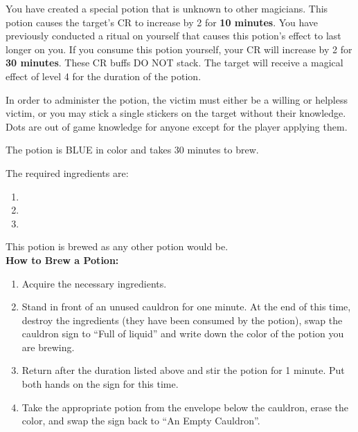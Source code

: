 \documentclass[green]{NeptuneBall}
\begin{document}
\name{\gBuff{}}

You have created a special potion that is unknown to other magicians. This potion causes the target's CR to increase by 2 for {\bf 10 minutes}.  You have previously conducted a ritual on yourself that causes this potion's effect to last longer on you. If you consume this potion yourself, your CR will increase by 2 for {\bf 30 minutes}. These CR buffs DO NOT stack. The target will receive a magical effect of level 4 for the duration of the potion.

In order to administer the potion, the victim must either be a willing or helpless victim, or you may stick a single stickers on the target without their knowledge. Dots are out of game knowledge for anyone except for the player applying them.

The potion is BLUE in color and takes 30 minutes to brew. 

The required ingredients are:
\begin{enumerate}
\item \iManOfWar{}
\item \iTeeth{}
\item \iSwordfish{}
\end{enumerate}

This potion is brewed as any other potion would be.\\

{\bf How to Brew a Potion:}\\ %
\begin{enumerate}
  \item Acquire the necessary ingredients.
  \item Stand in front of an unused cauldron for one minute. At the end of this time, destroy the ingredients (they have been consumed by the potion), swap the cauldron sign to ``Full of liquid'' and write down the color of the potion you are brewing.
  \item Return after the duration listed above and stir the potion for 1 minute. Put both hands on the sign for this time.
  \item Take the appropriate potion from the envelope below the cauldron, erase the color, and swap the sign back to ``An Empty Cauldron''.
\end{enumerate}
\end{document}
